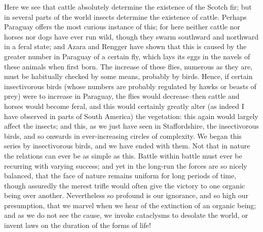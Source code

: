 Here we see that cattle absolutely determine the existence of the Scotch fir; but in several parts of the world insects determine the existence of cattle. Perhaps Paraguay offers the most curious instance of this; for here neither cattle nor horses nor dogs have ever run wild, though they swarm southward and northward in a feral state; and Azara and Rengger have shown that this is caused by the greater number in Paraguay of a certain fly, which lays its eggs in the navels of these animals when first born. The increase of these flies, numerous as they are, must be habitually checked by some means, probably by birds. Hence, if certain insectivorous birds (whose numbers are probably regulated by hawks or beasts of prey) were to increase in Paraguay, the flies would decrease--then cattle and horses would become feral, and this would certainly greatly alter (as indeed I have observed in parts of South America) the vegetation: this again would largely affect the insects; and this, as we just have seen in Staffordshire, the insectivorous birds, and so onwards in ever-increasing circles of complexity. We began this series by insectivorous birds, and we have ended with them. Not that in nature the relations can ever be as simple as this. Battle within battle must ever be recurring with varying success; and yet in the long-run the forces are so nicely balanced, that the face of nature remains uniform for long periods of time, though assuredly the merest trifle would often give the victory to one organic being over another. Nevertheless so profound is our ignorance, and so high our presumption, that we marvel when we hear of the extinction of an organic being; and as we do not see the cause, we invoke cataclysms to desolate the world, or invent laws on the duration of the forms of life!
